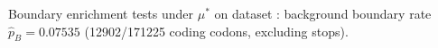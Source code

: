 Boundary enrichment tests under $\mu^\ast$ on dataset : background boundary rate $\widehat{p}_B=0.07535$ (12902/171225 coding codons, excluding stops).

